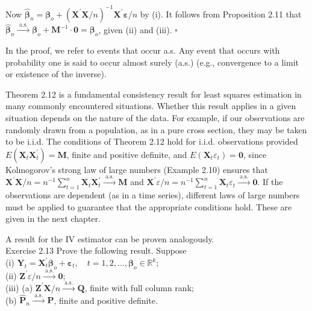 \documentclass[10pt]{article}
\begin{document}
Now $\hat{\boldsymbol{\beta}}_{n}=\boldsymbol{\beta}_{o}+\left(\mathbf{X}^{\prime} \mathbf{X} / n\right)^{-1} \mathbf{X}^{\prime} \boldsymbol{\varepsilon} / n$ by (i). It follows from Proposition 2.11 that $\hat{\boldsymbol{\beta}}_{n} \xrightarrow{\text { a.s. }} \boldsymbol{\beta}_{o}+\mathbf{M}^{-1} \cdot \mathbf{0}=\boldsymbol{\beta}_{o}$, given (ii) and (iii). \(\square\)

In the proof, we refer to events that occur a.s. Any event that occurs with probability one is said to occur almost surely (a.s.) (e.g., convergence to a limit or existence of the inverse).

Theorem 2.12 is a fundamental consistency result for least squares estimation in many commonly encountered situations. Whether this result applies in a given situation depends on the nature of the data. For example, if our observations are randomly drawn from a population, as in a pure cross section, they may be taken to be i.i.d. The conditions of Theorem 2.12 hold for i.i.d. observations provided $E\left(\mathbf{X}_{t} \mathbf{X}_{t}^{\prime}\right)=\mathbf{M}$, finite and positive definite, and $E\left(\mathbf{X}_{t} \varepsilon_{t}\right)=\mathbf{0}$, since Kolmogorov's strong law of large numbers (Example 2.10) ensures that $\mathbf{X}^{\prime} \mathbf{X} / n=n^{-1} \sum_{t=1}^{n} \mathbf{X}_{t} \mathbf{X}_{t}^{\prime} \xrightarrow{\text { a.s. }} \mathbf{M}$ and $\mathbf{X}^{\prime} \varepsilon / n=n^{-1} \sum_{t=1}^{n} \mathbf{X}_{t} \varepsilon_{t} \xrightarrow{\text { a.s. }} \mathbf{0}$. If the observations are dependent (as in a time series), different laws of large numbers must be applied to guarantee that the appropriate conditions hold. These are given in the next chapter.

A result for the IV estimator can be proven analogously.\\
Exercise 2.13 Prove the following result. Suppose\\
(i) $\mathbf{Y}_{t}=\mathbf{X}_{t}^{\prime} \boldsymbol{\beta}_{o}+\boldsymbol{\varepsilon}_{t}, \quad t=1,2, \ldots, \boldsymbol{\beta}_{o} \in \mathbb{R}^{k}$;\\
(ii) $\mathbf{Z}^{\prime} \varepsilon / n \xrightarrow{\text { a.s. }} \mathbf{0}$;\\
(iii) (a) $\mathbf{Z}^{\prime} \mathbf{X} / n \xrightarrow{\text { a.s. }} \mathbf{Q}$, finite with full column rank;\\
(b) $\hat{\mathbf{P}}_{n} \xrightarrow{\text { a.s. }} \mathbf{P}$, finite and positive definite.
\end{document}

